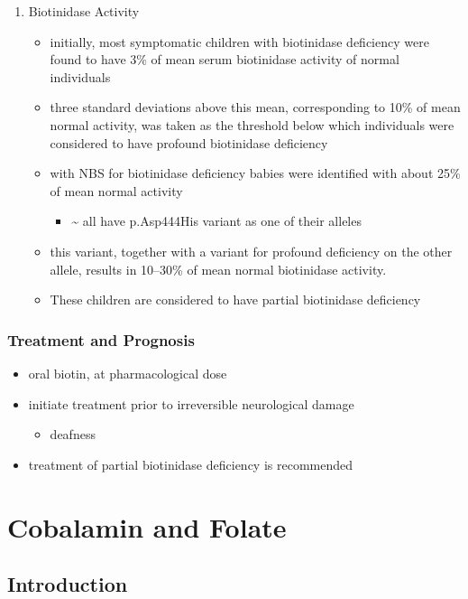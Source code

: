 \documentclass{scrartcl}
\begin{document}
\begin{enumerate}
\item Biotinidase Activity
\label{sec:org48fff51}
\begin{itemize}
\item initially, most symptomatic children with biotinidase deficiency
were found to have 3\% of mean serum biotinidase activity of normal
individuals
\item three standard deviations above this mean, corresponding to 10\% of
mean normal activity, was taken as the threshold below which
individuals were considered to have profound biotinidase deficiency
\item with NBS for biotinidase deficiency babies were identified with about 25\% of mean normal activity
\begin{itemize}
\item \textasciitilde{} all have p.Asp444His variant as one of their alleles
\end{itemize}
\item this variant, together with a variant for profound deficiency on the
other allele, results in 10–30\% of mean normal biotinidase activity.
\item These children are considered to have partial biotinidase deficiency
\end{itemize}
\end{enumerate}

\subsubsection{Treatment and Prognosis}
\label{sec:orga188b37}
\begin{itemize}
\item oral biotin, at pharmacological dose
\item initiate treatment prior to irreversible neurological damage
\begin{itemize}
\item deafness
\end{itemize}
\item treatment of partial biotinidase deficiency is recommended
\end{itemize}

\section{Cobalamin and Folate}
\label{sec:org4fd2c0d}
\subsection{Introduction}
\label{sec:org3624e22}
\end{document}
